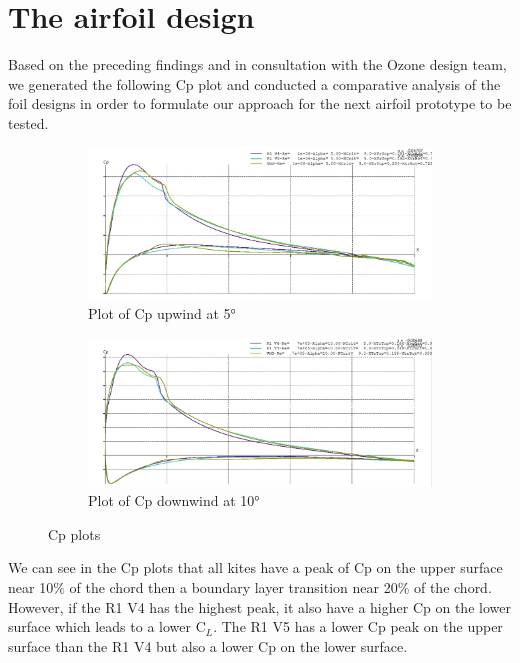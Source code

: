 \section{The airfoil design}
\label{sec:Ch1.5}

Based on the preceding findings and in consultation with the Ozone design team, we generated the following Cp plot and conducted a comparative analysis of the foil designs in order to formulate our approach for the next airfoil prototype to be tested.

\begin{figure}[H]
\begin{subfigure}{0.5\textwidth}
\includegraphics[width=1\textwidth]{figures/2D steady simulations/airfoil design/cp upwind 5deg.png}
\caption{Plot of Cp upwind at 5°}
\label{fig:Plot_of_Cp_upwind}
\end{subfigure}
\begin{subfigure}{0.5\textwidth}
\includegraphics[width=1\textwidth]{figures/2D steady simulations/airfoil design/cp downwind 10deg.png}
\caption{Plot of Cp downwind at 10°}
\label{fig:Plot_of_Cp_downwind}
\end{subfigure}
\caption{Cp plots}
\label{fig:Cp_plots}
\end{figure}

We can see in the Cp plots that all kites have a peak of Cp on the upper surface near 10$\%$ of the chord then a boundary layer transition near 20$\%$ of the chord. However, if the R1 V4 has the highest peak, it also have a higher Cp on the lower surface which leads to a lower C$_{L}$. The R1 V5 has a lower Cp peak on the upper surface than the R1 V4 but also a lower Cp on the lower surface.

